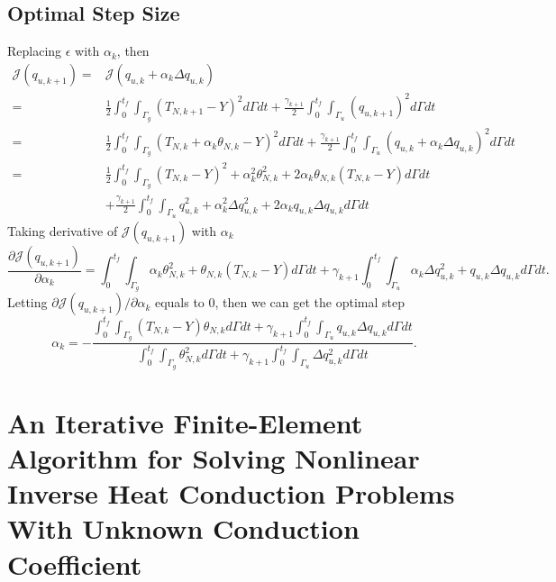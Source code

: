 \documentclass[UTF-8]{article}
\begin{document}
\subsection{Optimal Step Size}
Replacing $\epsilon$ with $\alpha_k$, then
\begin{align}
	\mathcal{J}(q_{u,k+1}) =& \mathcal{J}(q_{u,k} + \alpha_k \Delta q_{u,k}) \nonumber \\
	=& \frac{1}{2}\int_{0}^{t_f} \int_{\Gamma_g} (T_{N,k+1} - Y)^2 d\Gamma dt + \frac{\gamma_{k+1}}{2}\int_{0}^{t_f} \int_{\Gamma_u} (q_{u,k+1})^2 d\Gamma dt \nonumber \\
	=& \frac{1}{2}\int_{0}^{t_f} \int_{\Gamma_g} (T_{N,k} + \alpha_k \theta_{N,k} - Y)^2 d\Gamma dt + \frac{\gamma_{k+1}}{2}\int_{0}^{t_f} \int_{\Gamma_u} (q_{u,k} + \alpha_k \Delta q_{u,k})^2 d\Gamma dt \nonumber\\
	=& \frac{1}{2}\int_{0}^{t_f} \int_{\Gamma_g} (T_{N,k} - Y)^2 + \alpha_k^2 \theta_{N,k}^2 +2\alpha_k \theta_{N,k} (T_{N,k} - Y) d\Gamma dt \nonumber \\
	&+ \frac{\gamma_{k+1}}{2}\int_{0}^{t_f} \int_{\Gamma_u} q_{u,k}^2 + \alpha_k^2 \Delta q_{u,k}^2 + 2\alpha_k q_{u,k} \Delta q_{u,k} d\Gamma dt \nonumber 
\end{align}
Taking derivative of $\mathcal{J}(q_{u,k+1})$ with $\alpha_k$
\begin{equation*}
	\frac{\partial \mathcal{J}(q_{u,k+1})}{\partial \alpha_k} = \int_{0}^{t_f} \int_{\Gamma_g} \alpha_k \theta_{N,k}^2 + \theta_{N,k} (T_{N,k} - Y) d\Gamma dt + \gamma_{k+1} \int_{0}^{t_f} \int_{\Gamma_u} \alpha_k \Delta q_{u,k}^2 + q_{u,k} \Delta q_{u,k} d\Gamma dt.
\end{equation*}
Letting $\partial \mathcal{J}(q_{u,k+1}) / \partial \alpha_k$ equals to $0$, then we can get the optimal step
\begin{equation}\label{equ034}
	\alpha_k = - \frac{\int_{0}^{t_f} \int_{\Gamma_g} (T_{N,k} - Y) \theta_{N,k} d\Gamma dt + \gamma_{k+1} \int_{0}^{t_f} \int_{\Gamma_u} q_{u,k} \Delta q_{u,k} d\Gamma dt}{\int_{0}^{t_f} \int_{\Gamma_g} \theta_{N,k}^2 d\Gamma dt + \gamma_{k+1} \int_{0}^{t_f} \int_{\Gamma_u} \Delta q_{u,k}^2 d\Gamma dt}.
\end{equation}

\section{An Iterative Finite-Element Algorithm for Solving Nonlinear Inverse Heat Conduction Problems With Unknown Conduction Coefficient}
\end{document}

